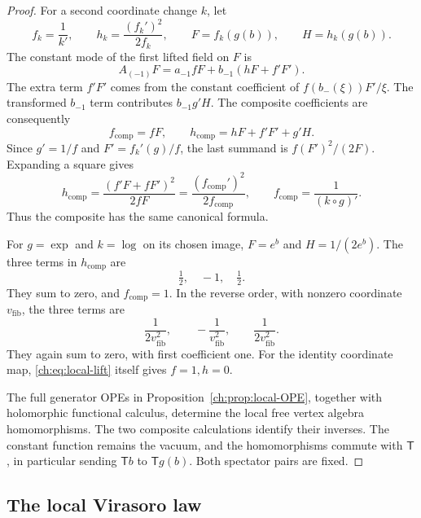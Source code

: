 \begin{proof}
For a second coordinate change $k$, let
\[
 f_k=\frac1{k'},\qquad h_k=\frac{(f_k')^2}{2f_k},\qquad
 F=f_k(g(b)),\qquad H=h_k(g(b)).
\]
The constant mode of the first lifted field on $F$ is
\[
             A_{(-1)}F
                 =a_{-1}fF+b_{-1}(hF+f'F').
\]
The extra term $f'F'$ comes from the constant coefficient of
$f(b_-(\xi))F'/\xi$.
The transformed $b_{-1}$ term contributes $b_{-1}g'H$.
The composite coefficients are consequently
\begin{equation}\label{ch:eq:composition}
          f_{\mathrm{comp}}=fF,\qquad
          h_{\mathrm{comp}}=hF+f'F'+g'H.
\end{equation}
Since $g'=1/f$ and $F'=f_k'(g)/f$, the last summand is
$f(F')^2/(2F)$.
Expanding a square gives
\[
        h_{\mathrm{comp}}
             =\frac{(f'F+fF')^2}{2fF}
             =\frac{(f_{\mathrm{comp}}')^2}{2f_{\mathrm{comp}}},
        \qquad f_{\mathrm{comp}}=\frac1{(k\circ g)'}.
\]
Thus the composite has the same canonical formula.

For $g=\exp$ and $k=\log$ on its chosen image,
$F=e^b$ and $H=1/(2e^b)$.
The three terms in $h_{\mathrm{comp}}$ are
\[
                             \tfrac12,\quad -1,\quad \tfrac12.
\]
They sum to zero, and $f_{\mathrm{comp}}=1$.
In the reverse order, with nonzero coordinate $v_{\mathrm{fib}}$,
the three terms are
\[
 \frac1{2v_{\mathrm{fib}}^2},\qquad
 -\frac1{v_{\mathrm{fib}}^2},\qquad
 \frac1{2v_{\mathrm{fib}}^2}.
\]
They again sum to zero, with first coefficient one.
For the identity coordinate map, \eqref{ch:eq:local-lift}
itself gives $f=1,h=0$.

The full generator OPEs in Proposition~\ref{ch:prop:local-OPE},
together with holomorphic functional calculus, determine the
local free vertex algebra homomorphisms.
The two composite calculations identify their inverses.
The constant function remains the vacuum, and the homomorphisms
commute with $\mathsf T$, in particular sending
$\mathsf T b$ to $\mathsf T g(b)$.
Both spectator pairs are fixed.
\end{proof}

\subsection{The local Virasoro law}

